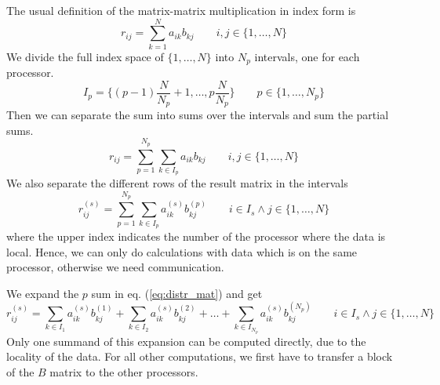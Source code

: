 The usual definition of the matrix-matrix multiplication in index form
is
\begin{displaymath}
  r_{ij}=\sum_{k=1}^N a_{ik} b_{kj}\qquad i,j\in\{1,\ldots,N\}
\end{displaymath}
We divide the full index space of $\{1,\ldots,N\}$ into $N_p$
intervals, one for each processor.
\begin{displaymath}
  I_p=\{(p-1)\frac{N}{N_p}+1,\ldots,p\frac{N}{N_p}\}\qquad p\in\{1,\ldots,N_p\}
\end{displaymath}
Then we can separate the sum into sums over the intervals and sum the
partial sums.
\begin{displaymath}
  r_{ij}=\sum_{p=1}^{N_p}\sum_{k\in I_p} a_{ik} b_{kj}\qquad i,j\in\{1,\ldots,N\}
\end{displaymath}
We also separate the different rows of the result matrix in the
intervals
\begin{equation}
  \label{eq:distr_mat}
  r_{ij}^{(s)}=\sum_{p=1}^{N_p}\sum_{k\in I_p} a_{ik}^{(s)}
  b_{kj}^{(p)}\qquad i\in I_s \wedge j\in\{1,\ldots,N\}
\end{equation}
where the upper index indicates the number of the processor where the
data is local.
Hence, we can only do calculations with data which is on the same
processor, otherwise we need communication.

We expand the $p$ sum in eq. (\ref{eq:distr_mat}) and get
\begin{equation}
  \label{eq:distr_mat_exp}
  r_{ij}^{(s)}=\sum_{k\in I_1} a_{ik}^{(s)}b_{kj}^{(1)}
  +\sum_{k\in I_2} a_{ik}^{(s)}b_{kj}^{(2)}
  +\ldots
  +\sum_{k\in I_{N_p}} a_{ik}^{(s)}b_{kj}^{({N_p})}
  \qquad i\in I_s \wedge j\in\{1,\ldots,N\}
\end{equation}
Only one summand of this expansion can be computed directly, due to
the locality of the data. For all other computations, we first have to
transfer a block of the $B$ matrix to the other processors.

